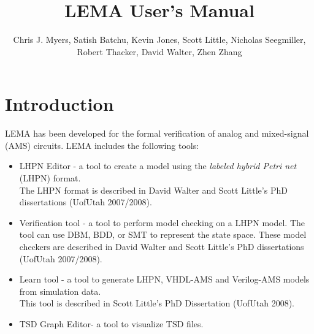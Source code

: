 \documentclass[titlepage,11pt]{article}
\title{LEMA User's Manual}
\author{Chris J. Myers, Satish Batchu, Kevin Jones, Scott Little, Nicholas Seegmiller, Robert Thacker, David Walter, Zhen Zhang}
\begin{document}
\maketitle

  
\tableofcontents

\clearpage
  

\section{Introduction}

\noindent
LEMA has been developed for the formal verification of analog and mixed-signal (AMS) circuits.  LEMA includes the following tools: 

\begin{itemize}
\item LHPN Editor - a tool to create a model using the 
\emph{labeled hybrid Petri net} (LHPN) format.\\ 
The LHPN format is described in
David Walter and Scott Little's PhD dissertations
(UofUtah 2007/2008).
\item Verification tool - a tool to perform model checking on a LHPN model.  The tool can use DBM, BDD, or SMT to represent the state space.
These model checkers are described in
David Walter and Scott Little's PhD dissertations
(UofUtah 2007/2008).
\item Learn tool - a tool to generate LHPN, VHDL-AMS and Verilog-AMS models from simulation data.\\
This tool is described in 
Scott Little's PhD Dissertation
(UofUtah 2008).
\item TSD Graph Editor- a tool to visualize TSD files. 
\end{itemize}
\end{document}
